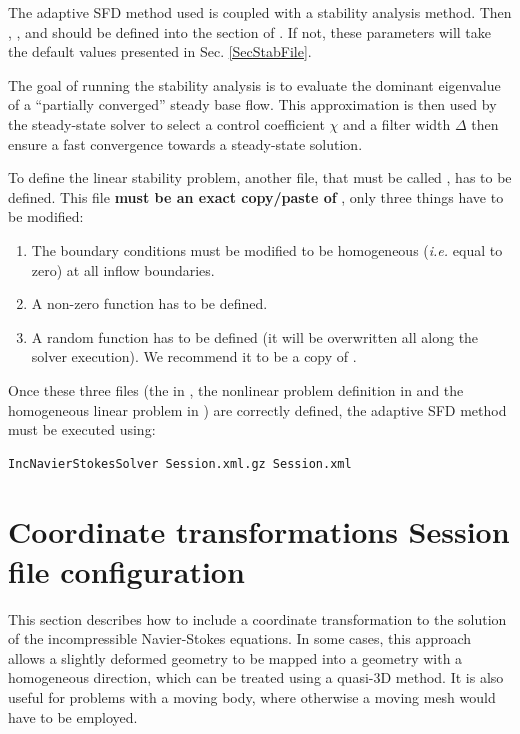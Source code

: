 The adaptive SFD method used is coupled with a stability analysis method. Then , ,  and  should be defined into the  section of . If not, these parameters will take the default values presented in Sec. \ref{SecStabFile}.

The goal of running the stability analysis is to evaluate the dominant eigenvalue of a ``partially converged'' steady base flow. This approximation is then used by the steady-state solver to select a control coefficient $\chi$ and a filter width $\Delta$ then ensure a fast convergence towards a steady-state solution.

To define the linear stability problem, another file, that must be called , has to be defined. This file \textbf{must be an exact copy/paste of} , only three things have to be modified:
\begin{enumerate}
\item The boundary conditions must be modified to be homogeneous (\textit{i.e.} equal to zero) at all inflow boundaries.
\item A non-zero function  has to be defined.
\item A random function  has to be defined (it will be overwritten all along the solver execution). We recommend it to be a copy of .
\end{enumerate}

Once these three files (the   in , the nonlinear problem definition in  and the homogeneous linear problem in ) are correctly defined, the adaptive SFD method must be executed using:

\begin{lstlisting}[style=BashInputStyle]
IncNavierStokesSolver Session.xml.gz Session.xml
\end{lstlisting}


\section{Coordinate transformations Session file configuration}\label{sec:mapping}

This section describes how to include a coordinate transformation
to the solution of the incompressible Navier-Stokes equations.
In some cases, this approach allows a slightly deformed geometry to
be mapped into a geometry with a homogeneous direction, which can be treated
using a quasi-3D method. It is also useful for problems with a moving body,
 where otherwise a moving mesh would have to be employed.
 
